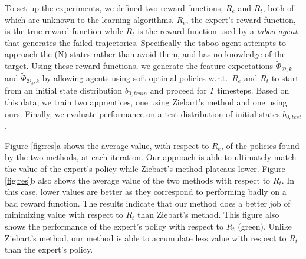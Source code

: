 \documentclass[conference]{IEEEtran}
\begin{document}
To set up the experiments, we defined two reward functions, $R_e$ and $R_t$, both of which are unknown to the learning algorithms.  $R_e$, the expert's reward function, is the true reward function while $R_t$ is the reward function used by a \emph{taboo agent} that generates the failed trajectories. Specifically the taboo agent attempts to approach the (N) states rather than avoid them, and has no knowledge of the target.  Using these reward functions, we generate the feature expectations $\widetilde{\Phi}_{\mathcal{D},k}$ and $\widetilde{\Phi}_{\mathcal{D}_b,k}$ by allowing agents using soft-optimal policies w.r.t.\ $R_e$ and $R_t$ to start from an initial state distribution $b_{0,train}$ and proceed for $T$ timesteps.  Based on this data, we train two apprentices, one using Ziebart's method and one using ours.  Finally, we evaluate performance on a test distribution of initial states $b_{0,test}$. 




Figure \ref{fig:res}a shows the average value, with respect to $R_e$, of the policies found by the two methods, at each iteration.  Our approach is able to ultimately match the value of the expert's policy while Ziebart's method plateaus lower. Figure \ref{fig:res}b also shows the average value of the two methods with respect to $R_t$.  In this case, lower values are better as they correspond to performing badly on a bad reward function.  The results indicate that our method does a better job of minimizing value with respect to $R_t$ than Ziebart's method.  This figure also shows the performance of the expert's policy with respect to $R_t$ (green). Unlike Ziebart's method, our method is able to accumulate less value with respect to $R_t$ than the expert's policy.
\end{document}
